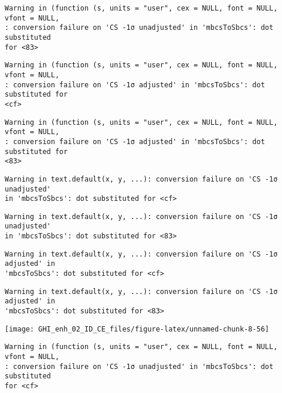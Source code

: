 \documentclass[
  10pt,
  a4paper,oneside]{article}
\begin{document}
\begin{verbatim}
Warning in (function (s, units = "user", cex = NULL, font = NULL, vfont = NULL,
: conversion failure on 'CS -1σ unadjusted' in 'mbcsToSbcs': dot substituted
for <83>
\end{verbatim}

\begin{verbatim}
Warning in (function (s, units = "user", cex = NULL, font = NULL, vfont = NULL,
: conversion failure on 'CS -1σ adjusted' in 'mbcsToSbcs': dot substituted for
<cf>
\end{verbatim}

\begin{verbatim}
Warning in (function (s, units = "user", cex = NULL, font = NULL, vfont = NULL,
: conversion failure on 'CS -1σ adjusted' in 'mbcsToSbcs': dot substituted for
<83>
\end{verbatim}

\begin{verbatim}
Warning in text.default(x, y, ...): conversion failure on 'CS -1σ unadjusted'
in 'mbcsToSbcs': dot substituted for <cf>
\end{verbatim}

\begin{verbatim}
Warning in text.default(x, y, ...): conversion failure on 'CS -1σ unadjusted'
in 'mbcsToSbcs': dot substituted for <83>
\end{verbatim}

\begin{verbatim}
Warning in text.default(x, y, ...): conversion failure on 'CS -1σ adjusted' in
'mbcsToSbcs': dot substituted for <cf>
\end{verbatim}

\begin{verbatim}
Warning in text.default(x, y, ...): conversion failure on 'CS -1σ adjusted' in
'mbcsToSbcs': dot substituted for <83>
\end{verbatim}

\begin{center}\texttt{[image: GHI\_enh\_02\_ID\_CE\_files/figure-latex/unnamed-chunk-8-56]} \end{center}

\begin{verbatim}
Warning in (function (s, units = "user", cex = NULL, font = NULL, vfont = NULL,
: conversion failure on 'CS -1σ unadjusted' in 'mbcsToSbcs': dot substituted
for <cf>
\end{verbatim}
\end{document}
